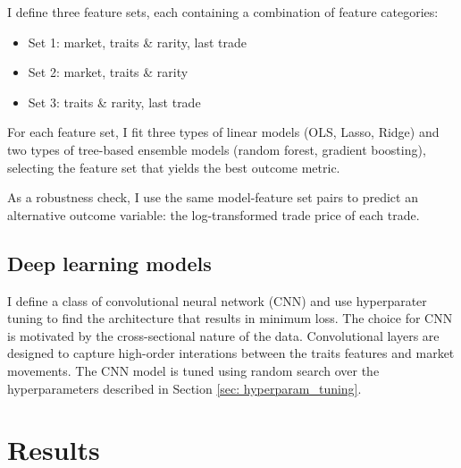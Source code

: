 \documentclass[12pt]{article}
\begin{document}
I define three feature sets, each containing a combination of feature categories:
\begin{itemize}
    \item Set 1: market, traits \& rarity, last trade
    \item Set 2: market, traits \& rarity
    \item Set 3: traits \& rarity, last trade
\end{itemize}

For each feature set, I fit three types of linear models (OLS, Lasso, Ridge) and two types of tree-based ensemble models (random forest, gradient boosting), selecting the feature set that yields the best outcome metric.

As a robustness check, I use the same model-feature set pairs to predict an alternative outcome variable: the log-transformed trade price of each trade.

\subsection{Deep learning models}
I define a class of convolutional neural network (CNN) and use hyperparater tuning to find the architecture that results in minimum loss. The choice for CNN is motivated by the cross-sectional nature of the data. Convolutional layers are designed to capture high-order interations between the traits features and market movements. The CNN model is tuned using random search over the hyperparameters described in Section \ref{sec: hyperparam_tuning}.


\section{Results}
\label{sec: results}
\end{document}
